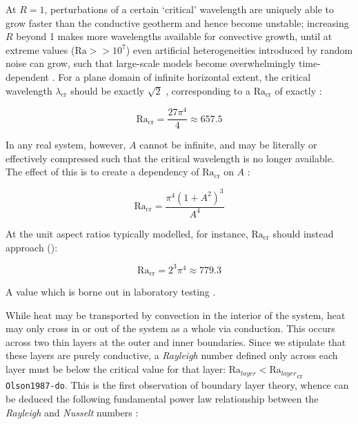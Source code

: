 \documentclass[a4paper,11pt,oneside]{book}
\begin{document}
At $R=1$, perturbations of a certain `critical' wavelength are uniquely able to grow faster than the conductive geotherm and hence become unstable; increasing $R$ beyond 1 makes more wavelengths available for convective growth, until at extreme values ($\mathrm{Ra} >> 10^7$) even artificial heterogeneities introduced by random noise can grow, such that large-scale models become overwhelmingly time-dependent \cite{Jarvis1984-xo}. For a plane domain of infinite horizontal extent, the critical wavelength $\lambda_{\mathrm{cr}}$ should be exactly $\sqrt{2}$ \cite{Chandrasekhar1961-ez}, corresponding to a $\mathrm{Ra}_{\mathrm{cr}}$ of exactly \cite{Malkus1954-ee}:

\begin{equation}
\mathrm{Ra}_{\mathrm{cr}} = \frac{27\pi^4}{4} \approx 657.5
\end{equation}

In any real system, however, $A$ cannot be infinite, and may be literally or effectively compressed such that the critical wavelength is no longer available. The effect of this is to create a dependency of $\mathrm{Ra}_{\mathrm{cr}}$ on $A$ \cite{Chandrasekhar1961-ez}:

\begin{equation}
\mathrm{Ra}_{\mathrm{cr}} = \frac{\pi^4 \left( 1 + A^2 \right)^3}{A^4}
\end{equation}

At the unit aspect ratios typically modelled, for instance, $\mathrm{Ra}_{\mathrm{cr}}$ should instead approach (\cite{Grover1968-wa}):

\begin{equation}
\mathrm{Ra}_{\mathrm{cr}} = 2^3\pi^4 \approx 779.3
\end{equation}

A value which is borne out in laboratory testing \cite{Whitehead2011-gs}.

While heat may be transported by convection in the interior of the system, heat may only cross in or out of the system as a whole via conduction. This occurs across two thin layers at the outer and inner boundaries. Since we stipulate that these layers are purely conductive, a \textit{Rayleigh} number defined only across each layer must be below the critical value for that layer: ${\mathrm{Ra}}_{layer} < {{\mathrm{Ra}}_{layer}}_{\mathrm{cr}}$ \texttt{Olson1987-do}. This is the first observation of boundary layer theory, whence can be deduced the following fundamental power law relationship between the \textit{Rayleigh} and \textit{Nusselt} numbers \cite{Schubert2001-ea}:
\end{document}
